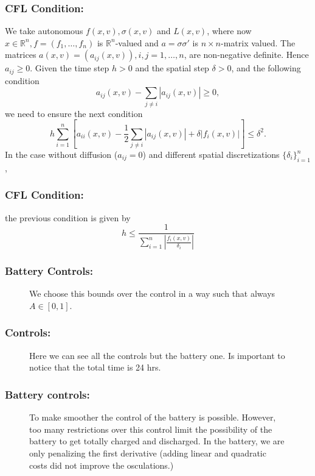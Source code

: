 \documentclass[aspectratio=169]{beamer}\usepackage[utf8]{inputenc}
\newcommand{\R}{\mathbb{R}}
\begin{document}
\begin{frame}\frametitle{CFL Condition:}
We take autonomous $f(x,v),\sigma(x,v)$ and $L(x,v)$, where now $x\in\R^n,f=(f_1,\dots,f_n)$ is $\R^n$-valued and $a=\sigma\sigma'$ is $n\times n$-matrix valued. The matrices $a(x,v)=(a_{ij}(x,v)),i,j=1,\dots,n$, are non-negative definite. Hence $a_{ij}\geq0$. Given the time step $h>0$ and the spatial step $\delta>0$, and the following condition
\begin{equation*}
a_{ij}(x,v)-\sum_{j\neq i}|a_{ij}(x,v)|\geq0,
\end{equation*}
we need to ensure the next condition\begin{equation*}
h\sum_{i=1}^n\left[a_{ii}(x,v)-\frac{1}{2}\sum_{j\neq i}|a_{ij}(x,v)|+\delta|f_i(x,v)|\right]\leq\delta^2.
\end{equation*}
In the case without diffusion ($a_{ij}=0$) and different spatial discretizations $\{\delta_i\}_{i=1}^n$,
\end{frame}

\begin{frame}\frametitle{CFL Condition:}
the previous condition is given by
\begin{equation*}
\boxed{h\leq\frac{1}{\sum_{i=1}^n\left|\frac{f_i(x,v)}{\delta_i}\right|}}
\end{equation*}
\end{frame}

\begin{frame}\frametitle{Battery Controls:}
\begin{figure}[ht!]
\centering
{}
\caption{We choose this bounds over the control in a way such that always $A\in[0,1]$.}
\end{figure}
\end{frame}

\begin{frame}\frametitle{Controls:}
\begin{figure}[ht!]
\centering
{}
\caption{Here we can see all the controls but the battery one. Is important to notice that the total time is 24 hrs.}
\end{figure}
\end{frame}

\begin{frame}\frametitle{Battery controls:}
\begin{figure}[ht!]
\centering
{}
\caption{To make smoother the control of the battery is possible. However, too many restrictions over this control limit the possibility of the battery to get totally charged and discharged. In the battery, we are only penalizing the first derivative (adding linear and quadratic costs did not improve the osculations.)}
\end{figure}
\end{frame}
\end{document}

